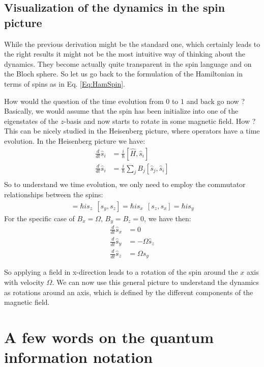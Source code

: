 \documentclass[10pt]{article}
\begin{document}
\subsection{Visualization of the dynamics in the spin picture}

While the previous derivation might be the standard one, which certainly leads to the right results it might not be the most intuitive way of thinking about the dynamics. They become actually quite transparent in the spin language and on the Bloch sphere. So let us go back to the formulation of the Hamiltonian in terms of spins as in Eq. \eqref{Eq:HamSpin}.

How would the question of the time evolution from $0$ to $1$ and back go now ? Basically, we would assume that the spin has been initialize into one of the eigenstates of the $z$-basis and now starts to rotate in some magnetic field. How ? This can be nicely studied in the Heisenberg picture, where operators have a time evolution. In the Heisenberg picture we have:
\begin{align}
\frac{d}{dt} \hat{s}_i &= \frac{i}{\hbar}\left[\hat{H},\hat{s}_i\right]\\
\frac{d}{dt} \hat{s}_i &= \frac{i}{\hbar}\sum_j B_j \left[\hat{s}_j,\hat{s}_i\right]\\
 \end{align}
So to understand we time evolution, we only need to employ the commutator relationships between the spins:
\begin{align}
[ s_x, s_y] = \hbar is_z~~[ s_y, s_z] = \hbar is_x~~[ s_z, s_x] = \hbar is_y
\end{align}
For the specific case of $B_x=\Omega$, $B_y = B_z = 0$, we have then:
\begin{align}
\frac{d}{dt} \hat{s}_x &= 0\\
\frac{d}{dt} \hat{s}_y &= -\Omega \hat{s}_z\\
\frac{d}{dt} \hat{s}_z &= \Omega \hat{s}_y
 \end{align}
 
 So applying a field in x-direction leads to a rotation of the spin around the $x$ axis with velocity $\Omega$. We can now use this general picture to understand the dynamics as rotations around an axis, which is defined by the different components of the magnetic field.

\section{A few words on the quantum information notation}
\end{document}
